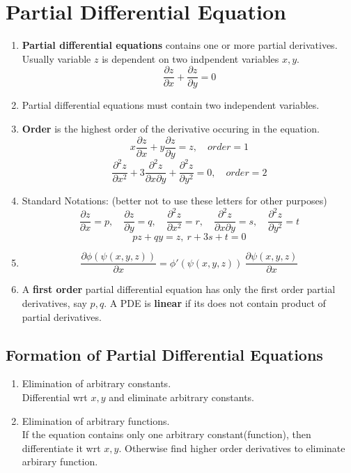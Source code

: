 \chapter{Partial Differential Equation}
\begin{enumerate}
	\item \textbf{Partial differential equations} contains one or more partial derivatives. Usually variable $z$ is dependent on two indpendent variables $x,y$.
		$$ \frac{\partial z}{\partial x} + \frac{\partial z}{\partial y} = 0$$
	\item Partial differential equations must contain two independent variables.
	\item \textbf{Order} is the highest order of the derivative occuring in the equation.
		$$ x\frac{\partial z}{\partial x} + y \frac{\partial z}{\partial y} = z,\quad order = 1$$
		$$ \frac{\partial ^2z}{\partial x^2} + 3\frac{\partial^2 z}{\partial x \partial y} + \frac{\partial^2 z}{\partial y^2} = 0, \quad order = 2$$
	\item Standard Notations: (better not to use these letters for other purposes)
		$$ \frac{\partial z}{\partial x} = p,\quad \frac{\partial z}{\partial y} = q,\quad \frac{\partial^2 z}{\partial x^2} = r,\quad \frac{\partial^2 z}{\partial x \partial y} = s,\quad \frac{\partial^2 z}{\partial y^2} = t$$
		$$ pz+qy = z,\ r+3s+t = 0$$
	\item $$ \frac{\partial \phi(\psi(x,y,z))}{\partial x} = \phi'(\psi(x,y,z))\ \frac{\partial \psi(x,y,z)}{\partial x} $$
	\item A \textbf{first order} partial differential equation has only the first order partial derivatives, say $p,q$. A PDE is \textbf{linear} if its does not contain product of partial derivatives.
\end{enumerate}

\section{Formation of Partial Differential Equations}
\begin{enumerate}
	\item Elimination of arbitrary constants.\\
		Differential wrt $x,y$ and eliminate arbitrary constants.
	\item Elimination of arbitrary functions.\\
		If the equation contains only one arbitrary constant(function), then differentiate it wrt $x,y$. Otherwise find higher order derivatives to eliminate arbirary function.
\end{enumerate}

